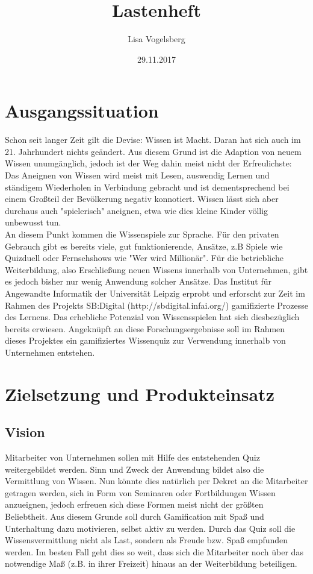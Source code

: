 \documentclass[11pt,a4paper]{scrreprt}
\title{Lastenheft}
\author{Lisa Vogelsberg}
\date{29.11.2017}
\begin{document}
\tableofcontents

\chapter{Ausgangssituation}
Schon seit langer Zeit gilt die Devise: Wissen ist Macht. Daran hat sich auch im 21. Jahrhundert nichts geändert. Aus diesem Grund ist die Adaption von neuem Wissen unumgänglich, jedoch ist der Weg dahin meist nicht der Erfreulichste: Das Aneignen von Wissen wird meist mit Lesen, auswendig Lernen und ständigem Wiederholen in Verbindung gebracht und ist dementsprechend bei einem Großteil der Bevölkerung negativ konnotiert. Wissen lässt sich aber durchaus auch "spielerisch" aneignen, etwa wie dies kleine Kinder völlig unbewusst tun.\\
An diesem Punkt kommen die Wissenspiele zur Sprache. Für den privaten Gebrauch gibt es bereits viele, gut funktionierende, Ansätze, z.B Spiele wie Quizduell oder Fernsehshows wie "Wer wird Millionär". Für die betriebliche Weiterbildung, also Erschließung neuen Wissens innerhalb von Unternehmen, gibt es jedoch bisher nur wenig Anwendung solcher Ansätze. Das Institut für Angewandte Informatik der Universität Leipzig erprobt und erforscht zur Zeit im Rahmen des Projekts SB:Digital (http://sbdigital.infai.org/) gamifizierte Prozesse des Lernens.
Das erhebliche Potenzial von Wissensspielen hat sich diesbezüglich bereits erwiesen. Angeknüpft an diese Forschungsergebnisse soll im Rahmen dieses Projektes ein gamifiziertes Wissenquiz zur Verwendung innerhalb von Unternehmen entstehen.
\chapter{Zielsetzung und Produkteinsatz}
\section{Vision}
Mitarbeiter von Unternehmen sollen mit Hilfe des entstehenden Quiz weitergebildet werden. Sinn und Zweck der Anwendung bildet also die Vermittlung von Wissen. Nun könnte dies natürlich per Dekret an die Mitarbeiter getragen werden, sich in Form von Seminaren oder Fortbildungen Wissen anzueignen, jedoch erfreuen sich diese Formen meist nicht der größten Beliebtheit. Aus diesem Grunde soll durch Gamification mit Spaß und Unterhaltung dazu motivieren, selbst aktiv zu werden. Durch das Quiz soll die Wissensvermittlung nicht als Last, sondern als Freude bzw. Spaß empfunden werden. Im besten Fall geht dies so weit, dass sich die Mitarbeiter noch über das notwendige Maß (z.B. in ihrer Freizeit) hinaus an der Weiterbildung beteiligen. 
\end{document}
